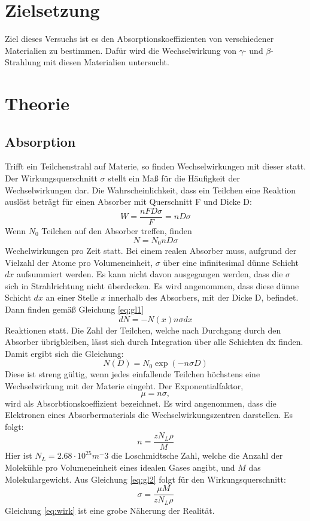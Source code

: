 \section{Zielsetzung}
Ziel dieses Versuchs ist es den Absorptionskoeffizienten von verschiedener Materialien zu bestimmen.
Dafür wird die Wechselwirkung von $\gamma$- und $\beta$-Strahlung mit diesen Materialien untersucht.
\section{Theorie}
\label{sec:Theorie}
\subsection{Absorption}
Trifft ein Teilchenstrahl auf Materie, so finden Wechselwirkungen mit dieser statt.
Der Wirkungsquerschnitt $\sigma$ stellt ein Maß für die Häufigkeit der Wechselwirkungen dar.
Die Wahrscheinlichkeit, dass ein Teilchen eine Reaktion auslöst beträgt für einen Absorber mit Querschnitt F und Dicke D:
\begin{equation}
  W= \frac{nFD\sigma}{F}= nD \sigma
\end{equation}
Wenn $N_0$ Teilchen auf den Absorber treffen, finden
\begin{equation}
  N = N_0 nD \sigma
  \label{eq:gl1}
\end{equation}
Wechelwirkungen pro Zeit statt.
Bei einem realen Absorber muss, aufgrund der Vielzahl der Atome pro Volumeneinheit, $\sigma$ über eine infinitesimal dünne Schicht $dx$ aufsummiert werden.
Es kann nicht davon ausgegangen werden, dass die $\sigma$ sich in Strahlrichtung nicht überdecken.
Es wird angenommen, dass diese dünne Schicht $dx$ an einer Stelle $x$ innerhalb des Absorbers, mit der Dicke D, befindet.
Dann finden gemäß Gleichung \eqref{eq:gl1}
\begin{equation}
  dN = -N(x) n \sigma dx
\end{equation}
Reaktionen statt.
Die Zahl der Teilchen, welche nach Durchgang durch den Absorber übrigbleiben, lässt sich durch Integration über alle Schichten dx finden.
Damit ergibt sich die Gleichung:
\begin{equation}
  N(D) = N_0 \exp(-n\sigma D)
\end{equation}
Diese ist streng gültig, wenn jedes einfallende Teilchen höchstens eine Wechselwirkung mit der Materie eingeht.
Der Exponentialfaktor,
\begin{equation}
  \mu = n \sigma   ,
\end{equation}
wird als Absorbtionskoeffizient bezeichnet.
Es wird angenommen, dass die Elektronen eines Absorbermaterials die Wechselwirkungszentren darstellen.
Es folgt:
\begin{equation}
  n= \frac{z N_L \rho}{M}
  \label{eq:gl2}
\end{equation}
Hier ist $N_L=2.68\cdot 10^{25} m^-3$\cite{Nl} die Loschmidtsche Zahl, welche die Anzahl der Molekühle pro Volumeneinheit eines idealen Gases angibt, und $M$ das Molekulargewicht.
Aus Gleichung \eqref{eq:gl2} folgt für den Wirkungsquerschnitt:
\begin{equation}
  \sigma=\frac{\mu M}{z N_L \rho}
  \label{eq:wirk}
\end{equation}
Gleichung \eqref{eq:wirk} ist eine grobe Näherung der Realität.
